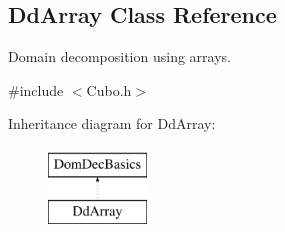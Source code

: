 \hypertarget{classDdArray}{\subsection{\-Dd\-Array \-Class \-Reference}
\label{classDdArray}
}


\-Domain decomposition using arrays.  




{\ttfamily \#include $<$\-Cubo.\-h$>$}

\-Inheritance diagram for \-Dd\-Array\-:\begin{figure}[H]
\begin{center}
\leavevmode
\includegraphics[height=2.000000cm]{classDdArray}
\end{center}
\end{figure}
